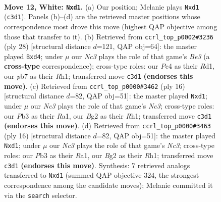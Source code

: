 \documentclass[11pt]{article}
\begin{document}
\clearpage

\begin{figure}[p]\centering
\begin{subfigure}{0.46\textwidth}\centering
\resizebox{\linewidth}{!}{%
\newchessgame
\chessboard[
  setfen={rnb2rk1/1p2p1b1/5np1/p1p2p1p/2P5/1PN2NP1/P3PPBP/R1Bq1RK1 w - - 0 12},
  showmover=false,
  pgfstyle=straightmove, color=movearrow, markmove={c3-d1}
]}
\caption{}
\end{subfigure}\hfill
\begin{subfigure}{0.46\textwidth}\centering
\resizebox{\linewidth}{!}{%
\newchessgame
\chessboard[
  setfen={r3kb1r/1b1p1ppp/p3p3/1p1nP3/3qNP2/3BB1P1/PPP4P/1K1R3R w kq - 0 15},
  showmover=false,
  pgfstyle=straightmove, color=movearrow, markmove={e3-d4}
]}
\caption{}
\end{subfigure}
\\[4pt]
\begin{subfigure}{0.46\textwidth}\centering
\resizebox{\linewidth}{!}{%
\newchessgame
\chessboard[
  setfen={rnb1kb1r/1p3ppp/p3pn2/2P5/P1p5/2N2NP1/1P2PPBP/R1BqK2R w KQkq - 0 9},
  showmover=false,
  pgfstyle=straightmove, color=movearrow, markmove={c3-d1}
]}
\caption{}
\end{subfigure}\hfill
\begin{subfigure}{0.46\textwidth}\centering
\resizebox{\linewidth}{!}{%
\newchessgame
\chessboard[
  setfen={rnb1kb1r/1p3ppp/p3pn2/2P5/P1p5/2N2NP1/1P2PPBP/R1BqK2R w KQkq - 0 9},
  showmover=false,
  pgfstyle=straightmove, color=movearrow, markmove={c3-d1}
]}
\caption{}
\end{subfigure}
\caption{\textbf{Move 12, White: \texttt{Nxd1}.} (a) Our position; Melanie plays \texttt{Nxd1} (\texttt{c3d1}). Panels (b)--(d) are the retrieved master positions whose correspondence most drove this move (highest QAP objective among those that transfer to it). (b) Retrieved from \texttt{ccrl\_top\_p0002\#3236} (ply 28) [structural distance $d$=121, QAP obj=64]: the master played \texttt{Bxd4}; under $\mu$ our \emph{Nc3} plays the role of that game's \emph{Be3} (a \textbf{cross-type} correspondence); cross-type roles: our \emph{P}c4 as their \emph{R}d1, our \emph{p}b7 as their \emph{R}h1; transferred move \texttt{c3d1} \textbf{(endorses this move)}. (c) Retrieved from \texttt{ccrl\_top\_p0000\#3462} (ply 16) [structural distance $d$=82, QAP obj=51]: the master played \texttt{Nxd1}; under $\mu$ our \emph{Nc3} plays the role of that game's \emph{Nc3}; cross-type roles: our \emph{P}b3 as their \emph{R}a1, our \emph{B}g2 as their \emph{R}h1; transferred move \texttt{c3d1} \textbf{(endorses this move)}. (d) Retrieved from \texttt{ccrl\_top\_p0000\#3463} (ply 16) [structural distance $d$=82, QAP obj=51]: the master played \texttt{Nxd1}; under $\mu$ our \emph{Nc3} plays the role of that game's \emph{Nc3}; cross-type roles: our \emph{P}b3 as their \emph{R}a1, our \emph{B}g2 as their \emph{R}h1; transferred move \texttt{c3d1} \textbf{(endorses this move)}. Synthesis: 7 retrieved analogs transferred to \texttt{Nxd1} (summed QAP objective 324, the strongest correspondence among the candidate moves); Melanie committed it via the \texttt{search} selector.}
\label{fig:thought-m22}
\end{figure}
\end{document}
